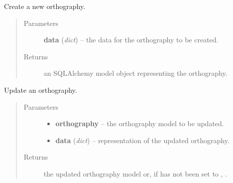 \documentclass[letterpaper,10pt,english]{sphinxmanual}
\begin{document}

\begin{fulllineitems}
\label{api:onlinelinguisticdatabase.controllers.orthographies.createNewOrthography}
Create a new orthography.
\begin{quote}\begin{description}
\item[{Parameters}] \leavevmode
\textbf{data} (\emph{dict}) -- the data for the orthography to be created.

\item[{Returns}] \leavevmode
an SQLAlchemy model object representing the orthography.

\end{description}\end{quote}

\end{fulllineitems}


\begin{fulllineitems}
\label{api:onlinelinguisticdatabase.controllers.orthographies.updateOrthography}
Update an orthography.
\begin{quote}\begin{description}
\item[{Parameters}] \leavevmode\begin{itemize}
\item {} 
\textbf{orthography} -- the orthography model to be updated.

\item {} 
\textbf{data} (\emph{dict}) -- representation of the updated orthography.

\end{itemize}

\item[{Returns}] \leavevmode
the updated orthography model or, if  has not been set
to , .

\end{description}\end{quote}

\end{fulllineitems}
\end{document}
